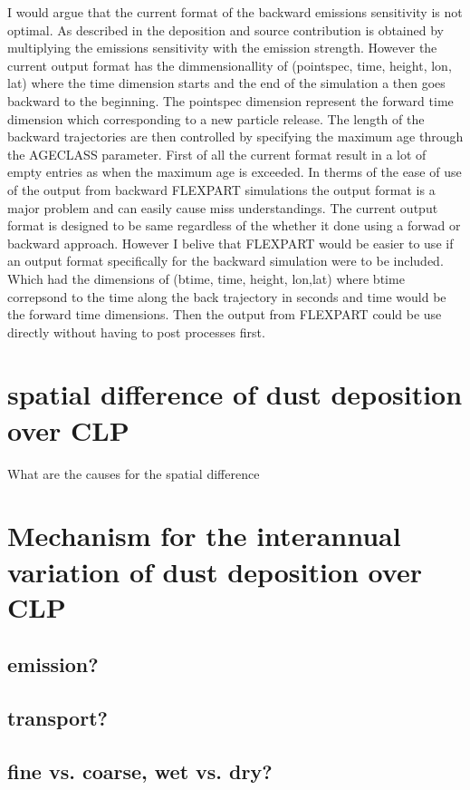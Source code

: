 I would argue that the current format of the backward emissions sensitivity is not optimal. As described in  the deposition and source contribution is obtained by multiplying the emissions sensitivity with the emission strength. However the current output format has the dimmensionallity of (pointspec, time, height, lon, lat) where the time dimension starts and the end of the simulation a  then goes backward to the beginning. The pointspec dimension represent the forward time dimension which corresponding to a new particle release. The length of the backward trajectories are then controlled by specifying the maximum age through the AGECLASS parameter. First of all the current format result in a lot of empty entries as when the maximum age is exceeded. In therms of the ease of use of the output from backward FLEXPART simulations the output format is a major problem and can easily cause miss understandings. The current output format is designed to be same regardless of the whether it done using a forwad or backward approach. However I belive that FLEXPART would be easier to use if an output format specifically for the backward simulation were to be included. Which had the dimensions of (btime, time, height, lon,lat) where btime correpsond to the time along the back trajectory in seconds and time would be the forward time dimensions. Then the output from FLEXPART could be use directly without having to post processes first. 

\section{spatial difference of dust deposition over CLP}
What are the causes for the spatial difference


\section{Mechanism for the interannual variation of dust deposition over CLP }

\subsection{emission?}
\subsection{transport?}
\subsection{fine vs. coarse, wet vs. dry?}
